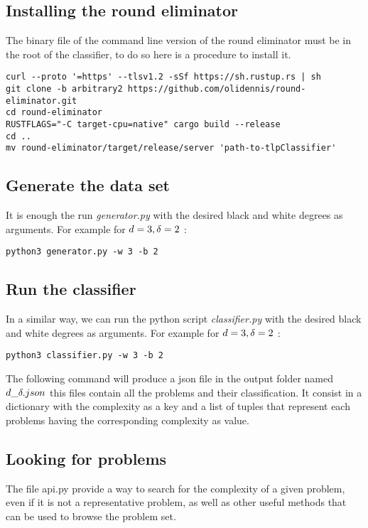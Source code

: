 \subsection{Installing the round eliminator}
The binary file of the command line version of the round eliminator must be in the root of the classifier, to do so here is a procedure to install it.
\begin{lstlisting}
curl --proto '=https' --tlsv1.2 -sSf https://sh.rustup.rs | sh
git clone -b arbitrary2 https://github.com/olidennis/round-eliminator.git
cd round-eliminator
RUSTFLAGS="-C target-cpu=native" cargo build --release
cd ..
mv round-eliminator/target/release/server 'path-to-tlpClassifier'
\end{lstlisting}
\subsection{Generate the data set}
It is enough the run \textit{generator.py} with the desired black and white degrees as arguments. For example for $d = 3, \delta =2$ :
\begin{lstlisting}
python3 generator.py -w 3 -b 2 
\end{lstlisting}
\subsection{Run the classifier}
In a similar way, we can run the python script \textit{classifier.py} with the desired black and white degrees as arguments. For example for $d = 3, \delta =2$ :
\begin{lstlisting}
python3 classifier.py -w 3 -b 2 
\end{lstlisting}
The following command will produce a json file in the output folder named $d\_\delta.json$ this files contain all the problems and their classification. It consist in a dictionary with the complexity as a key and a list of tuples that represent each problems having the corresponding complexity as value. 

\subsection{Looking for problems}
The file api.py provide a way to search for the complexity of a given problem, even if it is not a representative problem, as well as other useful methods that can be used to browse the problem set.

